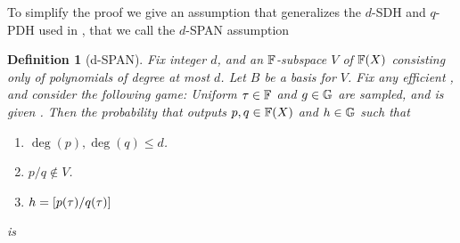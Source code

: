 \documentclass[11pt]{article}
\numberwithin{figure}{section} %
\newtheorem{dfn}[thm]{Definition}
\begin{document}
To simplify the proof we give an assumption that generalizes the $d$-SDH and $q$-PDH used in \cite{PHGR}, 
that we call the $d$-SPAN assumption
\begin{dfn}[d-SPAN]\label{dfn:spanassump}
 Fix integer $d$, and an $\mathbb F$-subspace $V$ of $\mathbb F(X)$ consisting only of polynomials of degree at most $d$.
 Let $B$ be a basis for $V$. Fix any efficient \adv, and consider the following game:
 Uniform $\tau\in \mathbb F$ and $g\in {\mathbb G}$ are sampled, and \adv is given . Then the probability that \adv 
 outputs  $p,q\in \mathbb F(X)$ and $h\in {\mathbb G}$ such that
 \begin{enumerate}
  \item $\deg(p),\deg(q)\leq d$.
  \item $p/q \notin V$.
  \item $h= \left[p(\tau)/q(\tau)\right]$
 \end{enumerate}
is \negl
\end{dfn}
\end{document}

